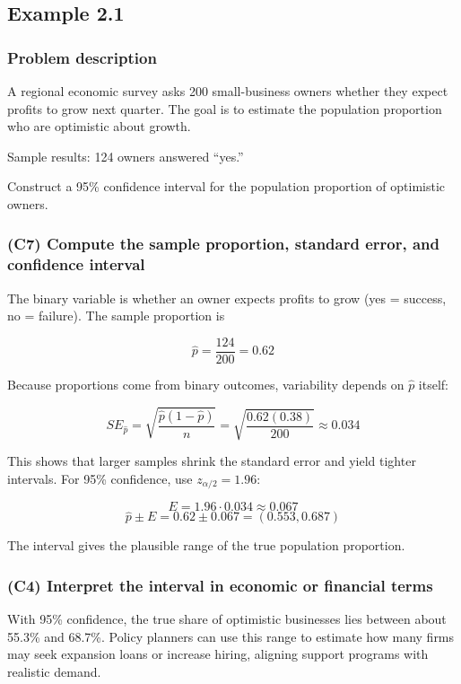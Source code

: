 \subsection{Example 2.1}\label{sec:interval-example2-1}

\subsubsection{Problem description}\label{subsec:interval-example2-1-problem}

A regional economic survey asks 200 small-business owners whether they expect profits to grow next quarter. The goal is to estimate the population proportion who are optimistic about growth.

Sample results: 124 owners answered ``yes.''

Construct a 95\% confidence interval for the population proportion of optimistic owners.


\subsubsection{(C7) Compute the sample proportion, standard error, and confidence interval}\label{subsubsec:interval-example2-1-c7}

The binary variable is whether an owner expects profits to grow (yes = success, no = failure). The sample proportion is

\[
\hat{p} = \frac{124}{200} = 0.62
\]

Because proportions come from binary outcomes, variability depends on \(\hat{p}\) itself:

\[
SE_{\hat{p}} = \sqrt{\frac{\hat{p}(1 - \hat{p})}{n}} = \sqrt{\frac{0.62(0.38)}{200}} \approx 0.034
\]

This shows that larger samples shrink the standard error and yield tighter intervals. For 95\% confidence, use \(z_{\alpha/2} = 1.96\):

\[
E = 1.96 \cdot 0.034 \approx 0.067
\]
\[
\hat{p} \pm E = 0.62 \pm 0.067 = (0.553, 0.687)
\]

The interval gives the plausible range of the true population proportion.

\subsubsection{(C4) Interpret the interval in economic or financial terms}\label{subsubsec:interval-example2-1-c4}

With 95\% confidence, the true share of optimistic businesses lies between about 55.3\% and 68.7\%. Policy planners can use this range to estimate how many firms may seek expansion loans or increase hiring, aligning support programs with realistic demand.

